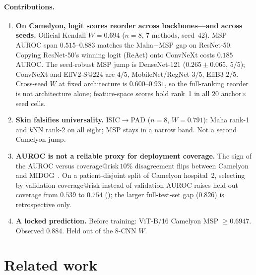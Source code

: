 \documentclass[anon]{midl}
\begin{document}
\paragraph{Contributions.}
\begin{enumerate}
\item \textbf{On Camelyon, logit scores reorder across backbones---and across seeds.}
Official Kendall $W=0.694$ ($n{=}8$, 7 methods, seed~42).
MSP AUROC span $0.515$--$0.883$ matches the Maha${-}$MSP gap on ResNet-50.
Copying ResNet-50's winning logit (ReAct) onto ConvNeXt costs $0.185$ AUROC.
The seed-robust MSP jump is DenseNet-121 ($0.265{\pm}0.065$, $5/5$); ConvNeXt and EffV2-S@224 are $4/5$, MobileNet/RegNet $3/5$, EffB3 $2/5$.
Cross-seed $W$ at fixed architecture is $0.600$--$0.931$, so the full-ranking reorder is not architecture alone; feature-space scores hold rank~1 in all $20$ anchor${\times}$seed cells.
\item \textbf{Skin falsifies universality.}
ISIC$\to$PAD ($n{=}8$, $W{=}0.791$): Maha rank-1 and $k$NN rank-2 on all eight; MSP stays in a narrow band. Not a second Camelyon jump.
\item \textbf{AUROC is not a reliable proxy for deployment coverage.}
The sign of the AUROC versus coverage@risk\,$10\%$ disagreement flips between Camelyon and MIDOG~\cite{geifman2019selectivenet,traub2024augrc}.
On a patient-disjoint split of Camelyon hospital~2, selecting by validation coverage@risk instead of validation AUROC raises held-out coverage from $0.539$ to $0.754$ (); the larger full-test-set gap ($0.826$) is retrospective only.
\item \textbf{A locked prediction.}
Before training: ViT-B/16 Camelyon MSP ${\ge}0.6947$. Observed $0.884$. Held out of the 8-CNN $W$.
\end{enumerate}

\section{Related work}
\end{document}
